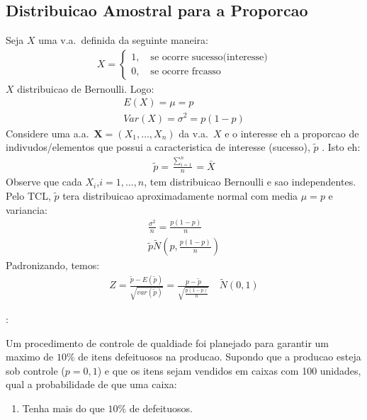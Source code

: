 \subsection{Distribuicao Amostral para a Proporcao}
\begin{description}
  \item Seja $X$ uma v.a.\ definida da seguinte maneira:
\begin{align}
  X= \begin{cases}  
    1, \quad \text{se ocorre sucesso(interesse)} \\
    0, \quad \text{se ocorre frcasso}
  \end{cases}
\end{align}
$X$ distribuicao de Bernoulli. Logo:
\begin{align*}
  E(X) = \mu= p \\
  Var(X)= \sigma^2= p \left(1-p\right)
\end{align*}
Considere uma a.a.\ $\mathbf{X}= \left(X_1,\ldots, X_{n}\right)$ da v.a.\ $X$ e o interesse eh a proporcao de indivudos/elementos
que possui a caracteristica de interesse (sucesso), $\tilde{p}$ . Isto eh:
\begin{align}
  \tilde{p} = \frac{\sum \limits_{i=1}^{n}}{n}= \bar{X}
\end{align}
Observe que cada $X_i$,$i=1, \ldots, n$, tem distribuicao Bernoulli e sao independentes. Pelo TCL, $\tilde{p}$ tera distribuicao 
aproximadamente normal com media $\mu=p$ e variancia:
\begin{align*}
  \frac{\sigma^2}{n} = \frac{p(1-p)}{n}\\
  \tilde{p} \tilde N (p, \frac{p(1-p)}{n})
\end{align*}
Padronizando, temos:
\begin{align*}
  Z= \frac{\tilde{p} - E(\tilde{p})}{\sqrt{var(\tilde{p})}} = \frac{p-\tilde{p}}{\sqrt{\frac{p(1-p)}{n}}} \quad \tilde  N(0,1)
\end{align*}
\item[Exemplo]:
  \begin{description}
    \item  Um procedimento de controle de qualdiade foi planejado para garantir um maximo de $10\%$ de itens defeituosos na producao.
  Supondo que a producao esteja sob controle ($p=0,1$) e que os itens sejam vendidos em caixas com 100 unidades, qual a probabilidade de que uma caixa:
\item  \begin{enumerate}[label=(\alph*)]
     \item Tenha mais do que $10\%$ de defeituosos.

\end{enumerate}
\end{description}
\end{description}
